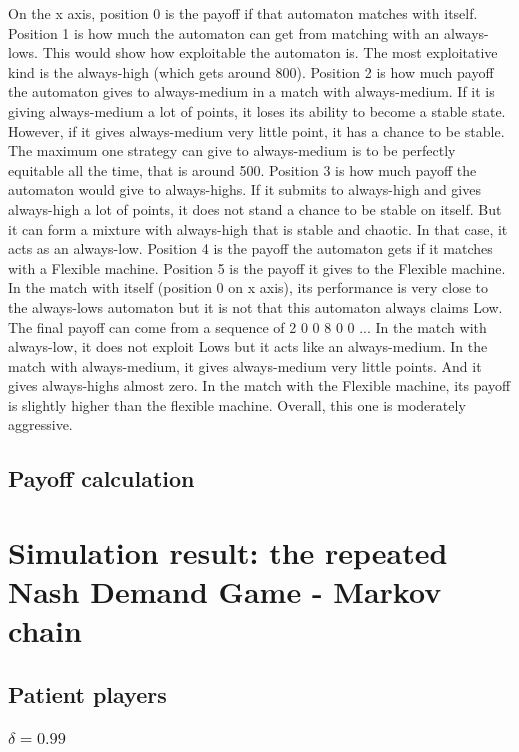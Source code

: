 \documentclass[12.5pt]{report}
\begin{document}
On the x axis, position 0 is the payoff if that automaton matches with itself. Position 1 is how much the automaton can get from matching with an always-lows. This would show how exploitable the automaton is. The most exploitative kind is the always-high (which gets around 800). Position 2 is how much payoff the automaton gives to always-medium in a match with always-medium. If it is giving always-medium a lot of points, it loses its ability to become a stable state. However, if it gives always-medium very little point, it has a chance to be stable. The maximum one strategy can give to always-medium is to be perfectly equitable all the time, that is around 500. Position 3 is how much payoff the automaton would give to always-highs. If it submits to always-high and gives always-high a lot of points, it does not stand a chance to be stable on itself. But it can form a mixture with always-high that is stable and chaotic. In that case, it acts as an always-low. Position 4 is the payoff the automaton gets if it matches with a Flexible machine. Position 5 is the payoff it gives to the Flexible machine.\\

In the match with itself (position 0 on x axis), its performance is very close to the always-lows automaton but it is not that this automaton always claims Low. The final payoff can come from a sequence of 2 0 0 8 0 0 ... In the match with always-low, it does not exploit Lows but it acts like an always-medium. In the match with always-medium, it gives always-medium very little points. And it gives always-highs almost zero. In the match with the Flexible machine, its payoff is slightly higher than the flexible machine. Overall, this one is moderately aggressive.\\

\section{Payoff calculation}

\chapter{Simulation result: the repeated Nash Demand Game - Markov chain}

\section{Patient players}

\subsection{$\delta = 0.99$}
\end{document}
